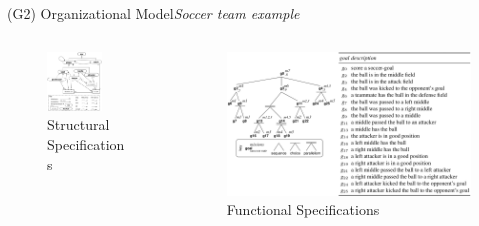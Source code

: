 \begin{frame}{(G2) Organizational Model}{\textit{Soccer team example}}

    \vspace{-2.5ex}

    \begin{columns}
        \hspace{-16ex}
        \begin{column}{0.5\textwidth}
            \centering
            \begin{figure}[H]
                \includegraphics[width=0.7\textwidth]{figures/soccer_ss.png}
                \caption*{Structural Specifications}
            \end{figure}
        \end{column}
        \hspace{-20ex}
        \begin{column}{0.5\textwidth}
            \centering
            \begin{figure}[H]
                \centering
                \includegraphics[width=1.2\textwidth]{figures/soccer_fs.png}
                \caption*{Functional Specifications}
            \end{figure}
        \end{column}
    \end{columns}


\end{frame}
